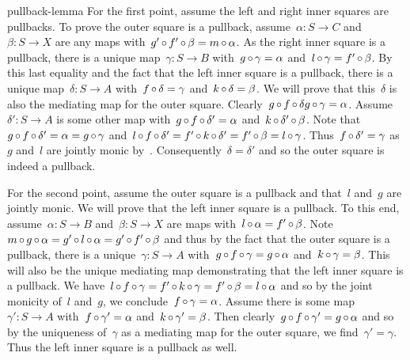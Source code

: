 \begin{solution}{pullback-lemma}%
    For the first point,
   assume the left and right inner squares are pullbacks.
To prove the outer square is a pullback,
    assume~$\alpha \colon S \to C$ and~$\beta\colon S \to X$
    are any maps with~$g' \mathop{\circ} f' \mathop{\circ} \beta = m \mathop{\circ} \alpha$.
As the right inner square is a pullback,
    there is a unique map~$\gamma\colon S \to B$
        with~$g \mathop{\circ} \gamma = \alpha$
            and~$l \mathop{\circ} \gamma = f' \mathop{\circ} \beta$.
By this last equality and the fact that the left inner square is
    a pullback, there is a unique map~$\delta \colon S \to A$
    with~$f \mathop{\circ} \delta = \gamma$
        and~$k \mathop{\circ} \delta = \beta$.
    We will prove that this~$\delta$ is also the mediating map
        for the outer square.
Clearly~$g \mathop{\circ} f \mathop{\circ} \delta g \mathop{\circ} \gamma = \alpha$.
Assume~$\delta'\colon S \to A$
    is some other map with~$g \mathop{\circ} f \mathop{\circ} \delta' = \alpha$
    and~$k \mathop{\circ} \delta' \mathop{\circ} \beta$.
Note that~$g \mathop{\circ} f \mathop{\circ} \delta' = \alpha = g \mathop{\circ} \gamma$
    and~$l \mathop{\circ} f \mathop{\circ} \delta' = f' \mathop{\circ} k \mathop{\circ} \delta'
        = f' \mathop{\circ} \beta = l \mathop{\circ} \gamma$.
Thus~$f \mathop{\circ} \delta' = \gamma$ as~$g$ and~$l$ are jointly monic by~.
Consequently~$\delta=\delta'$ and so the outer square is indeed a pullback.

For the second point, assume the outer square is a pullback
    and that~$l$ and~$g$ are jointly monic.
We will prove that the left inner square is a pullback.
To this end, assume~$\alpha\colon S \to B$ and~$\beta\colon S \to X$
    are maps with~$l \mathop{\circ} \alpha = f' \mathop{\circ} \beta$.
Note~$m \mathop{\circ} g \mathop{\circ} \alpha = g' \mathop{\circ} l \mathop{\circ} \alpha = g' \mathop{\circ} f' \mathop{\circ} \beta$
    and thus by the fact that the outer square is a pullback,
        there is a unique~$\gamma\colon S \to A$
        with~$g \mathop{\circ} f \mathop{\circ} \gamma = g \mathop{\circ} \alpha$
            and~$k \mathop{\circ} \gamma = \beta$.
    This will also be the unique mediating map
        demonstrating that the left inner square is a pullback.
We have~$l \mathop{\circ} f \mathop{\circ} \gamma = f' \mathop{\circ} k \mathop{\circ} \gamma
        = f' \mathop{\circ} \beta = l \mathop{\circ} \alpha$
            and so by the joint monicity of~$l$ and~$g$,
            we conclude~$f \mathop{\circ} \gamma = \alpha$.
    Assume there is some map~$\gamma' \colon S \to A$
        with~$f \mathop{\circ} \gamma' = \alpha$ and~$k \mathop{\circ} \gamma' = \beta$.
Then clearly~$g \mathop{\circ} f \mathop{\circ} \gamma' = g \mathop{\circ} \alpha$
    and so by the uniqueness of~$\gamma$
    as a mediating map for the outer square,
    we find~$\gamma' = \gamma$.
    Thus the left inner square is a pullback as well.
\end{solution}
